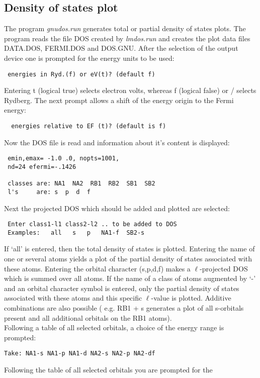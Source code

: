 \documentclass[aps,twocolumn,a4]{revtex4}
\begin{document}
\subsection {Density of states plot}
\label{dosplot}
The program {\it gnudos.run} generates total or partial density of states plots.
The program reads the file DOS created by {\it lmdos.run} and creates the plot
data files DATA.DOS, FERMI.DOS and DOS.GNU.
After the selection of the output device one is prompted for the energy
units to be used:
\begin{verbatim}
 energies in Ryd.(f) or eV(t)? (default f)
\end{verbatim}
Entering t (logical true) selects electron volts, whereas f (logical false) or
/ selects Rydberg. The next prompt allows a shift of the energy
origin to the Fermi energy:
\begin{verbatim}
  energies relative to EF (t)? (default is f)
\end{verbatim}
Now the DOS file is read and information about it's content is displayed:
\begin{verbatim}
 emin,emax= -1.0 .0, nopts=1001,
 nd=24 efermi=-.1426

 classes are: NA1  NA2  RB1  RB2  SB1  SB2
 l's     are: s  p  d  f
\end{verbatim}
Next the projected DOS which should be added and plotted are selected:
\begin{verbatim}
 Enter class1-l1 class2-l2 .. to be added to DOS
 Examples:   all   s   p   NA1-f  SB2-s
\end{verbatim}
If `all' is entered, then the total density of states is plotted. Entering
the name of one or several atoms yields a plot of the partial density
of states associated with these atoms. Entering the orbital character
(s,p,d,f) makes a $\ell $-projected DOS which is summed over all atoms.
If the name of a class of atoms augmented by  `-' and an orbital character
symbol is entered, only the partial density of states associated with these
atoms and this specific $\ell $-value is plotted. Additive combinations
are also possible ( e.g. RB1 + s generates a plot of all s-orbitals
present and all additional orbitals on the RB1 atoms).\\
Following a table of all selected orbitals, a choice of the energy
range is prompted:
\begin{verbatim}
Take: NA1-s NA1-p NA1-d NA2-s NA2-p NA2-df

\end{verbatim}
Following the table of all selected orbitals you are prompted for the
\end{document}
